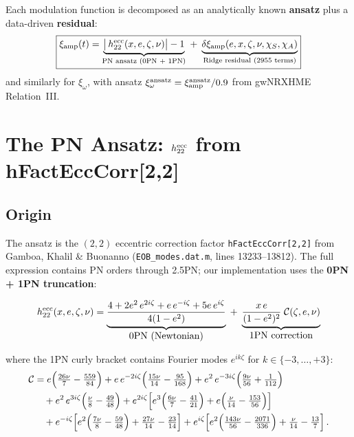 \documentclass[11pt,letterpaper]{article}
\newcommand{\xamp}{\xi_{\rm amp}}
\newcommand{\xomg}{\xi_{\omega}}
\newcommand{\dxamp}{\delta\xi_{\rm amp}}
\newcommand{\chiS}{\chi_S}
\newcommand{\chiA}{\chi_A}
\begin{document}
Each modulation function is decomposed as an analytically known \textbf{ansatz} plus a data-driven \textbf{residual}:
\begin{equation}
\boxed{\xamp(t) = \underbrace{\bigl|\,h_{22}^{\rm ecc}(x, e, \zeta, \nu)\bigr| - 1}_{\text{PN ansatz (0PN + 1PN)}} \;+\; \underbrace{\dxamp(e, x, \zeta, \nu, \chiS, \chiA)}_{\text{Ridge residual (2955 terms)}}}
\label{eq:decomp}
\end{equation}
and similarly for $\xomg$, with ansatz $\xomg^{\rm ansatz} = \xamp^{\rm ansatz}/0.9$ from gwNRXHME Relation~III.

\section{The PN Ansatz: \texorpdfstring{$h_{22}^{\rm ecc}$}{h22ecc} from hFactEccCorr[2,2]}
\label{sec:ansatz}

\subsection{Origin}

The ansatz is the $(2,2)$ eccentric correction factor \texttt{hFactEccCorr[2,2]} from Gamboa, Khalil \& Buonanno (\texttt{EOB\_modes.dat.m}, lines 13233--13812). The full expression contains PN orders through 2.5PN; our implementation uses the \textbf{0PN + 1PN truncation}:

\begin{equation}
h_{22}^{\rm ecc}(x, e, \zeta, \nu) = \underbrace{\frac{4 + 2e^2\,e^{2i\zeta} + e\,e^{-i\zeta} + 5e\,e^{i\zeta}}{4(1 - e^2)}}_{\displaystyle\text{0PN (Newtonian)}} \;+\; \underbrace{\frac{x\,e}{(1 - e^2)^2}\;\mathcal{C}(\zeta, e, \nu)}_{\displaystyle\text{1PN correction}}
\label{eq:ansatz}
\end{equation}

where the 1PN curly bracket contains Fourier modes $e^{ik\zeta}$ for $k \in \{-3, \ldots, +3\}$:
\begin{align}
\mathcal{C} &= e\Bigl(\tfrac{26\nu}{7} - \tfrac{559}{84}\Bigr) + e\,e^{-2i\zeta}\Bigl(\tfrac{15\nu}{14} - \tfrac{95}{168}\Bigr) + e^2\,e^{-3i\zeta}\Bigl(\tfrac{9\nu}{56} + \tfrac{1}{112}\Bigr) \nonumber\\
&\quad + e^2\,e^{3i\zeta}\Bigl(\tfrac{\nu}{8} - \tfrac{49}{48}\Bigr) + e^{2i\zeta}\Bigl[e^3\Bigl(\tfrac{6\nu}{7} - \tfrac{41}{21}\Bigr) + e\Bigl(\tfrac{\nu}{14} - \tfrac{153}{56}\Bigr)\Bigr] \nonumber\\
&\quad + e^{-i\zeta}\Bigl[e^2\Bigl(\tfrac{7\nu}{8} - \tfrac{59}{48}\Bigr) + \tfrac{27\nu}{14} - \tfrac{23}{14}\Bigr] + e^{i\zeta}\Bigl[e^2\Bigl(\tfrac{143\nu}{56} - \tfrac{2071}{336}\Bigr) + \tfrac{\nu}{14} - \tfrac{13}{7}\Bigr]\,.
\label{eq:curly}
\end{align}
\end{document}
